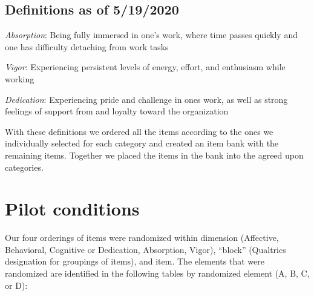 \documentclass[
]{book}
\begin{document}
\hypertarget{definitions-as-of-5192020}{%
\section{Definitions as of 5/19/2020}\label{definitions-as-of-5192020}}

\emph{Absorption}: Being fully immersed in one's work, where time passes quickly and one has difficulty detaching from work tasks

\emph{Vigor}: Experiencing persistent levels of energy, effort, and enthusiasm while working

\emph{Dedication}: Experiencing pride and challenge in ones work, as well as strong feelings of support from and loyalty toward the organization

With these definitions we ordered all the items according to the ones we individually selected for each category and created an item bank with the remaining items. Together we placed the items in the bank into the agreed upon categories.

\hypertarget{pilot2}{%
\chapter{Pilot conditions}\label{pilot2}}

Our four orderings of items were randomized within dimension (Affective, Behavioral, Cognitive or Dedication, Absorption, Vigor), ``block'' (Qualtrics designation for groupings of items), and item. The elements that were randomized are identified in the following tables by randomized element (A, B, C, or D):
\end{document}
